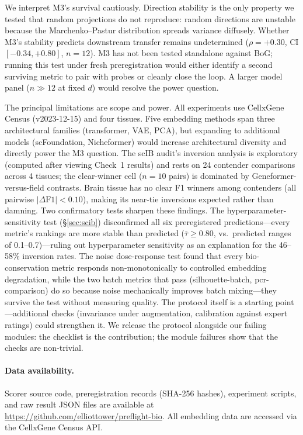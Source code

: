\documentclass[9pt,lineno]{elife}
\begin{document}
We interpret M3's survival cautiously. Direction stability is the only property we tested that random projections do not reproduce: random directions are unstable because the Marchenko--Pastur distribution spreads variance diffusely. Whether M3's stability predicts downstream transfer remains undetermined ($\rho = +0.30$, CI $[-0.34, +0.80]$, $n = 12$). M3 has not been tested standalone against BoG; running this test under fresh preregistration would either identify a second surviving metric to pair with probes or cleanly close the loop. A larger model panel ($n \gg 12$ at fixed $d$) would resolve the power question.

The principal limitations are scope and power. All experiments use CellxGene Census (v2023-12-15) and four tissues. Five embedding methods span three architectural families (transformer, VAE, PCA), but expanding to additional models (scFoundation, Nicheformer) would increase architectural diversity and directly power the M3 question. The scIB audit's inversion analysis is exploratory (computed after viewing Check~1 results) and rests on 24 contender comparisons across 4 tissues; the clear-winner cell ($n = 10$ pairs) is dominated by Geneformer-versus-field contrasts. Brain tissue has no clear F1 winners among contenders (all pairwise $|\Delta\text{F1}| < 0.10$), making its near-tie inversions expected rather than damning. Two confirmatory tests sharpen these findings. The hyperparameter-sensitivity test (\S\ref{sec:scib}) disconfirmed all six preregistered predictions---every metric's rankings are more stable than predicted ($\bar{\tau} \geq 0.80$, vs.\ predicted ranges of 0.1--0.7)---ruling out hyperparameter sensitivity as an explanation for the 46--58\% inversion rates. The noise dose-response test found that every bio-conservation metric responds non-monotonically to controlled embedding degradation, while the two batch metrics that pass (silhouette-batch, pcr-comparison) do so because noise mechanically improves batch mixing---they survive the test without measuring quality. The protocol itself is a starting point---additional checks (invariance under augmentation, calibration against expert ratings) could strengthen it. We release the protocol alongside our failing modules: the checklist is the contribution; the module failures show that the checks are non-trivial.

\paragraph{Data availability.} Scorer source code, preregistration records (SHA-256 hashes), experiment scripts, and raw result JSON files are available at \url{https://github.com/elliottower/preflight-bio}. All embedding data are accessed via the CellxGene Census API.
\end{document}
